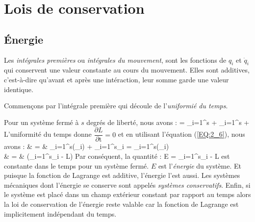 \chapter{Lois de conservation}

\section{\'Energie}\label{PAR:6}

Les \emph{int\'egrales premi\`eres} ou \emph{int\'egrales du mouvement}, sont les fonctions de $q_{i}$ et $\dot{q}_{i}$ qui conservent une valeur constante au cours du mouvement. Elles sont additives, c'est-\`a-dire qu'avant et après une int\'eraction, leur somme garde une valeur identique.

Commen\c{c}ons par l'int\'egrale premi\`ere qui d\'ecoule de l'\emph{uniformi\'e du temps}.

Pour un syst\`eme ferm\'e \`a $s$ degr\'es de libert\'e, nous avons :
\be
	 = \sum_{i=1}^{s} + \sum_{i=1}^{s} + 
\ee
L'uniformit\'e du temps donne $\dfrac{\partial L}{\partial \mathrm{t}} = 0$ et en utilisant l'\'equation (\ref{EQ:2_6}), nous avons :
\bea
	 & = & \sum_{i=1}^{s}\left(_{i}\right) + \sum_{i=1}^{s}_{i} = \sum_{i=1}^{s}\left(_{i}\right) \nonumber \\
	 & = & \left(\sum_{i=1}^{s}_{i} - L\right)
\eea
Par cons\'equent, la quantit\'e :
\be
	E = \sum_{i=1}^{s}_{i} - L \label{EQ:6_1}
\ee
est constante dans le temps pour un syst\`eme ferm\'e. $E$ est l'\emph{\'energie} du syst\`eme. Et puisque la fonction de Lagrange est additive, l'\'energie l'est aussi. Les syst\`emes m\'ecaniques dont l'\'energie se conserve sont appel\'es \emph{syst\`emes conservatifs}. Enfin, si le syst\`eme est plac\'e dans un champ ext\'erieur constant par rapport au temps alors la loi de conservation de l'\'energie reste valable car la fonction de Lagrange est implicitement ind\'ependant du temps.

